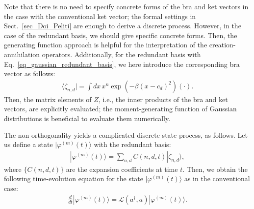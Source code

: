 \documentclass[sn-mathphys,Numbered]{sn-jnl}%
\theoremstyle{thmstyleone}%
\theoremstyle{thmstyletwo}%
\theoremstyle{thmstylethree}%
\begin{document}
Note that there is no need to specify concrete forms of the bra and ket vectors in the case with the conventional ket vector; the formal settings in Sect.~\ref{sec_Doi_Peliti} are enough to derive a discrete process. However, in the case of the redundant basis, we should give specific concrete forms. Then, the generating function approach is helpful for the interpretation of the creation-annihilation operators. Additionally, for the redundant basis with Eq.~\eqref{eq_gaussian_redundant_basis}, we here introduce the corresponding bra vector as follows:
\begin{align}
\langle \zeta_{n,d} |
= \int dx \,  x^n \exp\left( - \beta ( x - c_d )^2 \right) \left( \cdot \right).
\end{align}
Then, the matrix elements of $Z$, i.e., the inner products of the bra and ket vectors, are explicitly evaluated; the moment-generating function of Gaussian distributions is beneficial to evaluate them numerically.


The non-orthogonality yields a complicated discrete-state process, as follows. Let us define a state $| \varphi^{(m)}(t) \rangle$ with the redundant basis:
\begin{align}
| \varphi^{(m)}(t) \rangle = \sum_{n,d} C(n,d,t) | \zeta_{n,d} \rangle,
\label{eq_proposed_ket_state_time_evolution}
\end{align}
where $\{C(n,d,t)\}$ are the expansion coefficients at time $t$. Then, we obtain the following time-evolution equation for the state $| \varphi^{(m)}(t) \rangle$ as in the conventional case:
\begin{align}
\frac{d}{dt} | \varphi^{(m)}(t) \rangle  = \mathcal{L}\left( a^\dagger, a\right) | \varphi^{(m)}(t) \rangle.
\end{align}
\end{document}
